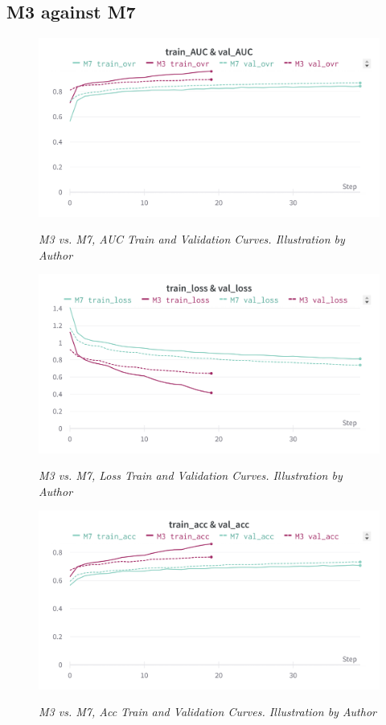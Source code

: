 \newpage

\subsection{M3 against M7}

\begin{figure}[H]
\centering
    \includegraphics[width=\textwidth]{imatges/results/AUCM3M7.png}
\caption[M3 vs. M7, AUC Train and Validation Curves]{\textit{M3 vs. M7, AUC Train and Validation Curves. Illustration by Author}}
{\label{fig:aucm0m4}}
\end{figure}


\begin{figure}[H]
\centering
    \includegraphics[width=\textwidth]{imatges/results/LossM3M7.png}
\caption[M3 vs. M7, Loss Train and Validation Curves]{\textit{M3 vs. M7, Loss Train and Validation Curves. Illustration by Author}}
{\label{fig:lossm0m4}}
\end{figure}

\newpage

\begin{figure}[H]
\centering
    \includegraphics[width=\textwidth]{imatges/results/AccM3M7.png}
\caption[M3 vs. M7, Acc Train and Validation Curves]{\textit{M3 vs. M7, Acc Train and Validation Curves. Illustration by Author}}
{\label{fig:accm0m4}}
\end{figure}
